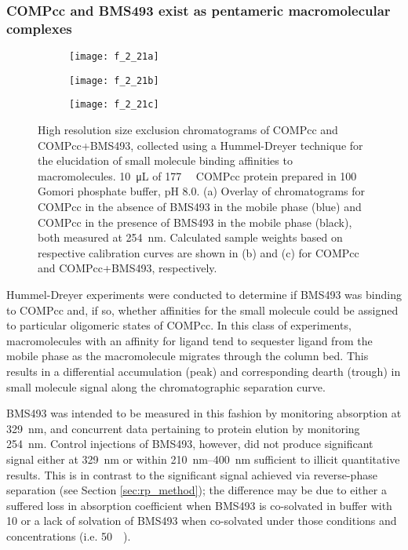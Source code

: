 \begin{refsection}
\subsubsection{COMPcc and BMS493 exist as pentameric macromolecular complexes}
\begin{figure}
    \centering
    \begin{subfigure}[b]{0.8\textwidth}
        \texttt{[image: f\_2\_21a]}
        \caption{}
    \end{subfigure}
    \begin{subfigure}[b]{0.4\textwidth}
        \texttt{[image: f\_2\_21b]}
        \caption{}
    \end{subfigure}
    \begin{subfigure}[b]{0.4\textwidth}
        \texttt{[image: f\_2\_21c]}
        \caption{}
    \end{subfigure}
    \caption{
    High resolution size exclusion chromatograms of COMPcc and COMPcc+BMS493,
    collected using a Hummel-Dreyer technique for the elucidation of small
    molecule binding affinities to macromolecules. \SI{10}{\uL} of
    \SI{177}{\micro\moLar} COMPcc protein prepared in \SI{100}{\milli\moLar}
    Gomori phosphate buffer, pH 8.0. (a) Overlay of chromatograms
    for COMPcc in the absence of BMS493 in the mobile phase (blue) and COMPcc in the
    presence of BMS493 in the mobile phase (black), both measured at
    \SI{254}{\nm}. Calculated sample weights based on respective calibration
    curves are shown in (b) and (c) for COMPcc and COMPcc+BMS493, respectively.
    }\label{fig:sec_results}
\end{figure}
Hummel-Dreyer experiments were conducted to determine if BMS493 was binding
to COMPcc and, if so, whether affinities for the small molecule could be assigned
to particular oligomeric states of COMPcc. In this class of
experiments, macromolecules with an affinity for ligand tend to sequester ligand
from the mobile phase as the macromolecule migrates through the column bed. This
results in a differential accumulation (peak) and corresponding dearth (trough)
in small molecule signal along the chromatographic separation curve. 

BMS493 was intended to be measured in this fashion by monitoring absorption at
\SI{329}{\nm}, and concurrent data pertaining to protein elution by monitoring
\SI{254}{\nm}.  Control injections of BMS493, however, did not produce
significant signal either at \SI{329}{\nm} or within \SIrange{210}{400}{\nm}
sufficient to illicit quantitative results. This is in contrast to the
significant signal achieved via reverse-phase separation (see Section
\ref{sec:rp_method}); the difference may be due to either a suffered loss in
absorption coefficient when BMS493 is co-solvated in buffer with
\SI{10}{\volper} or a lack of solvation of BMS493 when co-solvated under those
conditions and concentrations (i.e.  \SI{50}{\micro\moLar}).


\end{refsection}
